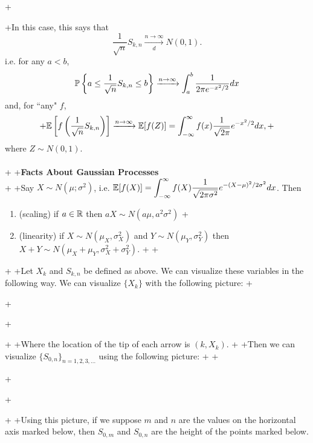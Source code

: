 +\documentclass{article}
\begin{document}
+In this case, this says that \[\frac{1}{\sqrt{n}}S_{k,n}\xrightarrow[d]{n\to\infty} N(0,1).\]  i.e. for any $a<b$, \[\mathbb{P}\left\{a\leq\frac{1}{\sqrt{n}}S_{k,n}\leq b\right\}\xrightarrow{n\to\infty}\int_a^b \frac{1}{2\pi e^{-x^2/2}}dx\] and, for ``any" $f$, \begin{equation}
+\mathbb{E}\left[f\left(\frac{1}{\sqrt{n}}S_{k,n}\right)\right]\xrightarrow{n\to\infty}\mathbb{E}[f(Z)]=\int_{-\infty}^\infty f(x)\frac{1}{\sqrt{2\pi}}e^{-x^2/2}dx,
+\end{equation} where $Z\sim N(0,1)$.\\\\
+
+\textbf{\Large Facts About Gaussian Processes}\\
+
+Say $X\sim N(\mu;\sigma^2)$, i.e. $\displaystyle\mathbb{E}[f(X)]=\int_{-\infty}^\infty f(X)\frac{1}{\sqrt{2\pi\sigma^2}}e^{-(X-\mu)^2/2\sigma^2}dx$.  Then \begin{enumerate}
+
+\item (scaling) if $a\in\mathbb{R}$ then $aX\sim N(a\mu,a^2\sigma^2)$
+\item (linearity) if $X\sim N(\mu_X,\sigma_X^2)$ and $Y\sim N(\mu_Y,\sigma_Y^2)$ then $X+Y\sim N(\mu_X+\mu_Y,\sigma_X^2+\sigma_Y^2)$.
+
+\end{enumerate}
+
+Let $X_k$ and $S_{k,n}$ be defined as above.  We can visualize these variables in the following way.  We can visualize $\{X_k\}$ with the following picture:
+\begin{center}
+
+\end{center}
+
+Where the location of the tip of each arrow is $(k,X_k)$.
+
+Then we can visualize $\{S_{0,n}\}_{n=1,2,3,\dots}$ using the following picture:
+
+\begin{center}
+
+\end{center}
+
+Using this picture, if we suppose $m$ and $n$ are the values on the horizontal axis marked below, then $S_{0,m}$ and $S_{0,n}$ are the height of the points marked below.
\end{document}
